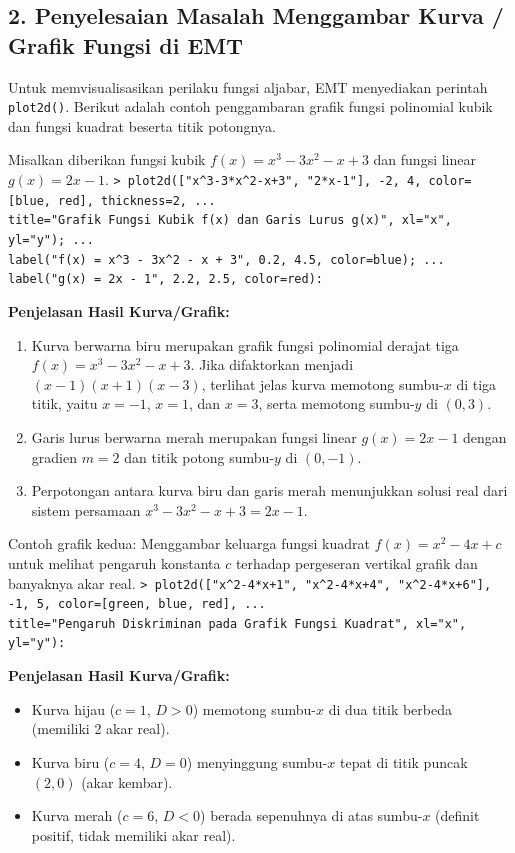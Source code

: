 \documentclass[11pt, a4paper]{article}
\newcommand{\emtcmd}[1]{\noindent\texttt{\textcolor{emtcommand}{>}\ #1}\par\smallskip}
\begin{document}
\subsection*{2. Penyelesaian Masalah Menggambar Kurva / Grafik Fungsi di EMT}

Untuk memvisualisasikan perilaku fungsi aljabar, EMT menyediakan perintah \texttt{plot2d()}. Berikut adalah contoh penggambaran grafik fungsi polinomial kubik dan fungsi kuadrat beserta titik potongnya.

Misalkan diberikan fungsi kubik $f(x) = x^3 - 3x^2 - x + 3$ dan fungsi linear $g(x) = 2x - 1$.
\emtcmd{plot2d(["x\^{}3-3*x\^{}2-x+3", "2*x-1"], -2, 4, color=[blue, red], thickness=2, ... \\
\hspace*{1em} title="Grafik Fungsi Kubik f(x) dan Garis Lurus g(x)", xl="x", yl="y"); ... \\
\hspace*{1em} label("f(x) = x\^{}3 - 3x\^{}2 - x + 3", 0.2, 4.5, color=blue); ... \\
\hspace*{1em} label("g(x) = 2x - 1", 2.2, 2.5, color=red):}

\textbf{Penjelasan Hasil Kurva/Grafik:}
\begin{enumerate}
    \item Kurva berwarna biru merupakan grafik fungsi polinomial derajat tiga $f(x) = x^3 - 3x^2 - x + 3$. Jika difaktorkan menjadi $(x-1)(x+1)(x-3)$, terlihat jelas kurva memotong sumbu-$x$ di tiga titik, yaitu $x = -1$, $x = 1$, dan $x = 3$, serta memotong sumbu-$y$ di $(0, 3)$.
    \item Garis lurus berwarna merah merupakan fungsi linear $g(x) = 2x - 1$ dengan gradien $m = 2$ dan titik potong sumbu-$y$ di $(0, -1)$.
    \item Perpotongan antara kurva biru dan garis merah menunjukkan solusi real dari sistem persamaan $x^3 - 3x^2 - x + 3 = 2x - 1$.
\end{enumerate}

Contoh grafik kedua: Menggambar keluarga fungsi kuadrat $f(x) = x^2 - 4x + c$ untuk melihat pengaruh konstanta $c$ terhadap pergeseran vertikal grafik dan banyaknya akar real.
\emtcmd{plot2d(["x\^{}2-4*x+1", "x\^{}2-4*x+4", "x\^{}2-4*x+6"], -1, 5, color=[green, blue, red], ... \\
\hspace*{1em} title="Pengaruh Diskriminan pada Grafik Fungsi Kuadrat", xl="x", yl="y"):}

\textbf{Penjelasan Hasil Kurva/Grafik:}
\begin{itemize}
    \item Kurva hijau ($c=1$, $D > 0$) memotong sumbu-$x$ di dua titik berbeda (memiliki 2 akar real).
    \item Kurva biru ($c=4$, $D = 0$) menyinggung sumbu-$x$ tepat di titik puncak $(2, 0)$ (akar kembar).
    \item Kurva merah ($c=6$, $D < 0$) berada sepenuhnya di atas sumbu-$x$ (definit positif, tidak memiliki akar real).
\end{itemize}
\end{document}
